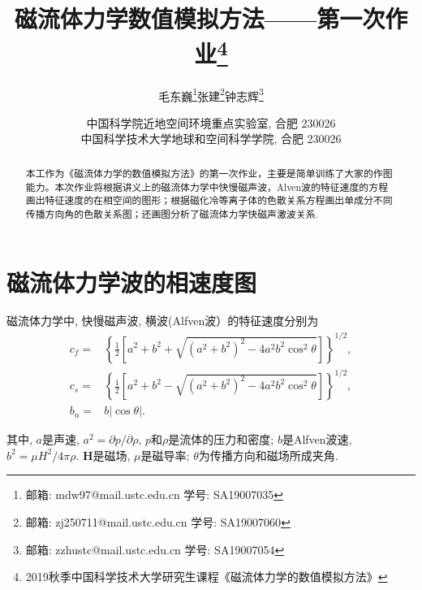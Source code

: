 \documentclass{article}
\begin{document}
	
	\renewcommand{\refname}{参考文献}
	\renewcommand{\figurename}{图}
	\renewcommand{\abstractname}{摘要}
	\def\due{2019年9月25日周三0:00}
	
	\title{磁流体力学数值模拟方法——第一次作业\footnote{2019秋季中国科学技术大学研究生课程《磁流体力学的数值模拟方法》}}
	
	
	\author{毛东巍\footnote{邮箱: mdw97@mail.ustc.edu.cn  学号: SA19007035}\quad 张建\footnote{邮箱: zj250711@mail.ustc.edu.cn  学号: SA19007060}\quad 钟志辉\footnote{邮箱: zzhustc@mail.ustc.edu.cn  学号: SA19007054}}
	
	\date{%
		\scriptsize%
		中国科学院近地空间环境重点实验室, 合肥 230026\\
		中国科学技术大学地球和空间科学学院, 合肥 230026
	}
	
	\maketitle
	
	\begin{abstract}
		本工作为《磁流体力学的数值模拟方法》的第一次作业，主要是简单训练了大家的作图能力。本次作业将根据讲义上的磁流体力学中快慢磁声波，Alven波的特征速度的方程画出特征速度的在相空间的图形；根据磁化冷等离子体的色散关系方程画出单成分不同传播方向角的色散关系图；还画图分析了磁流体力学快磁声激波关系.
	\end{abstract}
	
	\section{磁流体力学波的相速度图}
	
	磁流体力学中, 快慢磁声波, 横波(Alfven波）的特征速度分别为\citep{Jeffrey1964}
    \begin{align}
        c_f =& \left\{\frac{1}{2} \left[a^2 + b^2 + \sqrt{(a^2 + b^2)^2 - 4 a^2 b^2
			\cos^2\theta}\right]\right\}^{1/2},
		\\
		c_s =& \left\{\frac{1}{2} \left[a^2 + b^2 - \sqrt{(a^2 + b^2)^2 - 4 a^2 b^2
			\cos^2\theta}\right]\right\}^{1/2},
		\\
		b_n =& b \left|\cos\theta\right|.
    \end{align}
	
	其中, $a$是声速, $a^2 = \partial p / \partial \rho$, $p$和$\rho$是流体的压力和密度;
	$b$是Alfven波速, $b^2 = \mu H^2 / 4 \pi \rho$. $\boldsymbol{H}$是磁场, $\mu$是磁导率;
	$\theta$为传播方向和磁场所成夹角.
\end{document}
